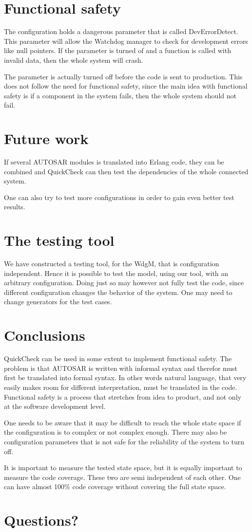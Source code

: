 \documentclass[a4paper]{article}
\begin{document}
\section{Functional safety}
The configuration holds a dangerous parameter that is called
DevErrorDetect. This parameter will allow the Watchdog manager to
check for development errors like null pointers. If the parameter is
turned of and a function is called with invalid data, then the whole
system will crash.

The parameter is actually turned off before the code is sent to
production. This does not follow the need for functional safety, since
the main idea with functional safety is if a component in the system
fails, then the whole system should not fail.

\section{Future work}
If several AUTOSAR modules is translated into Erlang code, they can be
combined and QuickCheck can then test the dependencies of the whole
connected system.

One can also try to test more configurations in order to gain even
better test results.

\section{The testing tool}
We have constructed a testing tool, for the WdgM, that is configuration
independent. Hence it is possible to test the model, using our tool, with an
arbitrary configuration. Doing just so may however not fully test the code,
since different configuration changes the behavior of the system. One may need
to change generators for the test cases.


\section{Conclusions}
QuickCheck can be used in some extent to implement functional
safety. The problem is that AUTOSAR is written with informal syntax
and therefor must first be translated into formal syntax. In other words
natural language, that very easily makes room for different interpretation,
must be translated in the code.
Functional safety is a process that stretches from idea to product,
and not only at the software development level.

One needs to be aware that it may be difficult to reach the whole
state space if the configuration is to complex or not complex
enough. There may also be configuration parameters that is not safe
for the reliability of the system to turn off.

It is important to measure the tested state space, but it is equally
important to measure the code coverage. These two are semi independent
of each other. One can have almost 100\% code coverage without covering
the full state space.

\section{Questions?}
\end{document}
